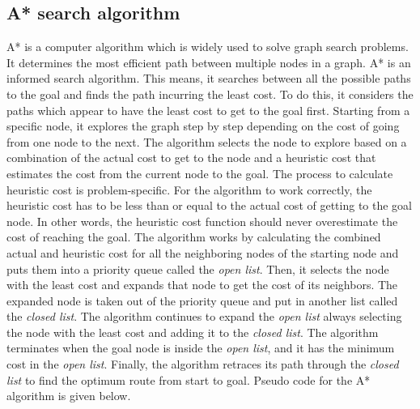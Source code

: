 
\subsection{A* search algorithm \cite{a8book} }
A* is a computer algorithm which is widely used to solve graph search problems. It determines the most efficient path between multiple nodes in a graph. A* is an informed search algorithm. This means, it searches between all the possible paths to the goal and finds the path incurring the least cost. To do this, it considers the paths which appear to have the least cost to get to the goal first. Starting from a specific node, it explores the graph step by step depending on the cost of going from one node to the next. The algorithm selects the node to explore based on a combination of the actual cost to get to the node and a heuristic cost that estimates the cost from the current node to the goal. The process to calculate heuristic cost is problem-specific. For the algorithm to work correctly, the heuristic cost has to be less than or equal to the actual cost of getting to the goal node. In other words, the heuristic cost function should never overestimate the cost of reaching the goal. The algorithm works by calculating the combined actual and heuristic cost for all the neighboring nodes of the starting node and puts them into a priority queue called the \textit{open list}. Then, it selects the node with the least cost and expands that node to get the cost of its neighbors. The expanded node is taken out of the priority queue and put in another list called the \textit{closed list}. The algorithm continues to expand the \textit{open list} always selecting the node with the least cost and adding it to the \textit{closed list}. The algorithm terminates when the goal node is inside the \textit{open list}, and it has the minimum cost in the \textit{open list}. Finally, the algorithm retraces its path through the \textit{closed list} to find the optimum route from start to goal. Pseudo code for the A* algorithm is given below.



